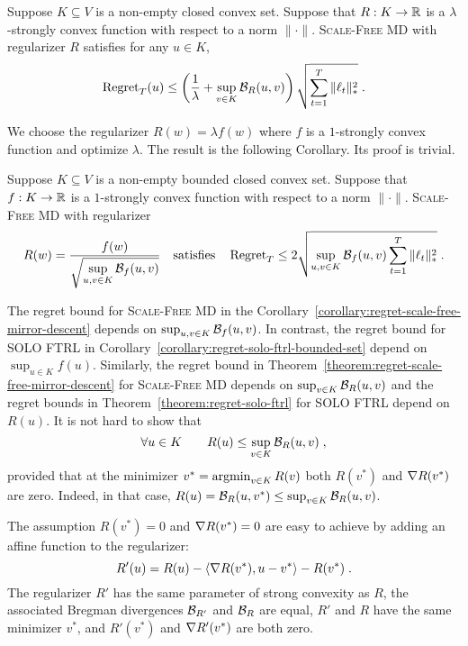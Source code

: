 \begin{theorem}
\label{theorem:regret-scale-free-mirror-descent}
Suppose $K \subseteq V$ is a non-empty closed convex set. Suppose that $R:K
\to \mathbb{R}$ is a $\lambda$-strongly convex function with respect to a norm
$\|\cdot\|$.  \textsc{Scale-Free MD} with regularizer $R$ satisfies
for any $u \in K$,
$$
\operatorname{Regret}_T(u)
\le
\left( \frac{1}{\lambda} + \sup_{v \in K} \mathcal{B}_R(u,v) \right) \sqrt{\sum_{t=1}^T \|\ell_t\|_*^2} \; .
$$
\end{theorem}

We choose the regularizer $R(w) = \lambda f(w)$ where $f$ is a $1$-strongly convex
function and optimize $\lambda$. The result is the following Corollary. Its
proof is trivial.

\begin{corollary}
\label{corollary:regret-scale-free-mirror-descent}
Suppose $K \subseteq V$ is a non-empty bounded closed convex set.  Suppose
that $f:K \to \mathbb{R}$ is a $1$-strongly convex function with respect to a norm
$\|\cdot\|$.  \textsc{Scale-Free MD} with regularizer
$$
R(w) = \frac{f(w)}{\displaystyle \sqrt{\sup_{u,v \in K} \Breg_f(u,v)}}
\quad \text{satisfies} \quad %
\Regret_T \le 2 \sqrt{\sup_{u,v \in K} \Breg_f(u,v) \sum_{t=1}^T \|\ell_t\|_*^2} \; .
$$
\end{corollary}

The regret bound for \textsc{Scale-Free MD} in the
Corollary~\ref{corollary:regret-scale-free-mirror-descent} depends on
$\sup_{u,v \in K} \mathcal{B}_f(u,v)$. In contrast, the regret bound for
\textsc{SOLO FTRL} in Corollary~\ref{corollary:regret-solo-ftrl-bounded-set}
depend on $\sup_{u \in K} f(u)$.  Similarly, the regret bound in
Theorem~\ref{theorem:regret-scale-free-mirror-descent} for \textsc{Scale-Free
MD} depends on $\sup_{v \in K} \mathcal{B}_R(u,v)$ and the regret bounds in
Theorem~\ref{theorem:regret-solo-ftrl}
for \textsc{SOLO FTRL} depend on $R(u)$. It is not hard to
show that
\begin{equation}
\label{equation:regularizer-vs-divergence}
\forall u \in K \qquad R(u) \le \sup_{v \in K} \mathcal{B}_R(u,v) \; ,
\end{equation}
provided that at the minimizer $v^* = \operatorname*{argmin}_{v \in K} R(v)$ both $R(v^*)$ and
$\nabla R(v^*)$ are zero. Indeed, in that case, $R(u) = \mathcal{B}_R(u,v^*) \le
\sup_{v \in K} \mathcal{B}_R(u,v)$.

The assumption $R(v^*) = 0$ and $\nabla R(v^*) = 0$
are easy to achieve by adding an affine function to the regularizer:
$$
R'(u) = R(u) - \langle \nabla R(v^*), u - v^* \rangle - R(v^*) \; .
$$
The regularizer $R'$ has the same parameter of strong convexity as $R$, the
associated Bregman divergences $\mathcal{B}_{R'}$ and $\mathcal{B}_{R}$ are equal, $R'$ and
$R$ have the same minimizer $v^*$, and $R'(v^*)$ and $\nabla R'(v^*)$ are both
zero.

